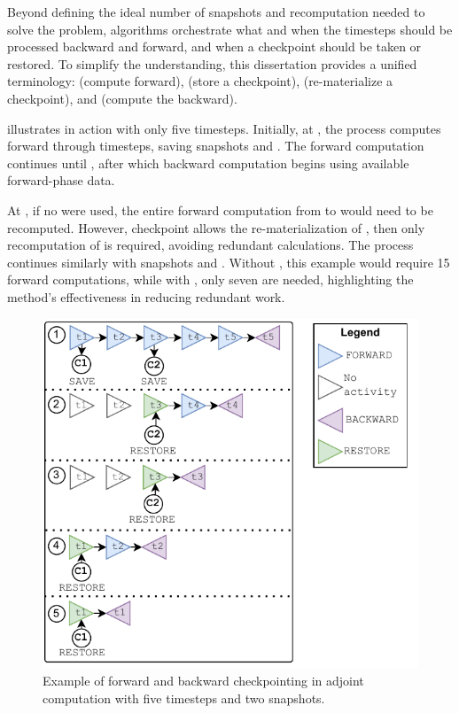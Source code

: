 \documentclass[Ingles,Final]{ic-tese-v3}
\begin{document}
Beyond defining the ideal number of snapshots and recomputation needed to solve the problem, \checkpointing algorithms orchestrate what and when the timesteps should be processed backward and forward, and when a checkpoint should be taken or restored. To simplify the understanding, this dissertation provides a unified terminology: \fwd (compute forward), \save (store a checkpoint), \restore (re-materialize a checkpoint), and \bwd (compute the backward).

 illustrates \checkpointing in action with only five timesteps. Initially, at , the process computes forward through timesteps, saving snapshots  and . The forward computation continues until , after which backward computation begins using available forward-phase data.

At , if no \checkpointing were used, the entire forward computation from  to  would need to be recomputed. However, checkpoint  allows the re-materialization of , then only recomputation of  is required, avoiding redundant calculations. The process continues similarly with snapshots  and . Without \checkpointing, this example would require 15 forward computations, while with \checkpointing, only seven are needed, highlighting the method's effectiveness in reducing redundant work.

\begin{figure}
    \centering
    \includegraphics[width=0.8\linewidth,clip]{figures/checkpointing.pdf}
    \caption[Checkpointing timeline]{Example of forward and backward checkpointing in adjoint computation with five timesteps and two snapshots.}
    \label{fig:checkpointing}
\end{figure}
 
\end{document}
